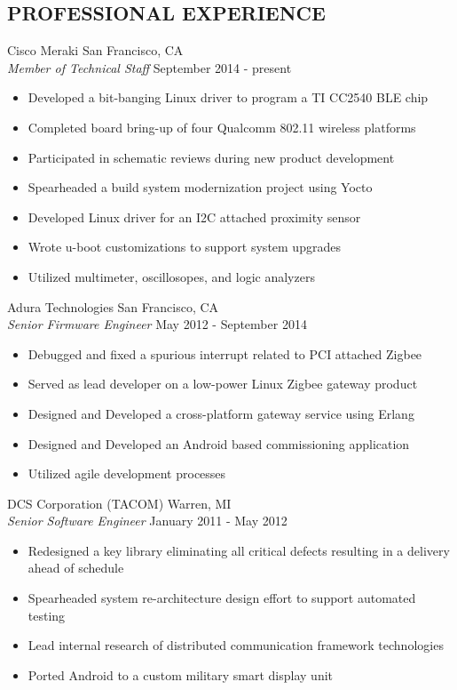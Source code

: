 \documentclass[line]{res}
\begin{document}
\begin{resume}
\section{PROFESSIONAL EXPERIENCE}
    \vspace{1mm}
    Cisco Meraki  \hfill San Francisco, CA\\
    {\sl Member of Technical Staff} \hfill September  2014 - present
    \vspace{1mm}
    \begin{itemize}
        \item Developed a bit-banging Linux driver to program a TI CC2540 BLE chip
        \item Completed board bring-up of four Qualcomm 802.11 wireless platforms
        \item Participated in schematic reviews during new product development 
        \item Spearheaded a build system modernization project using Yocto
        \item Developed Linux driver for an I2C attached proximity sensor
        \item Wrote u-boot customizations to support system upgrades  
        \item Utilized multimeter, oscillosopes, and logic analyzers
    \end{itemize}
    \vspace{1mm}
    Adura Technologies  \hfill San Francisco, CA\\
    {\sl Senior Firmware Engineer} \hfill May  2012 - September 2014
    \vspace{1mm}
    \begin{itemize}
       \item Debugged and fixed a spurious interrupt related to PCI attached Zigbee
       \item Served as lead developer on a low-power Linux Zigbee gateway product
       \item Designed and Developed a cross-platform gateway service using Erlang
       \item Designed and Developed an Android based commissioning application
       \item Utilized agile development processes
    \end{itemize}
    \vspace{-1mm}
    DCS Corporation (TACOM)  \hfill Warren, MI\\
    {\sl Senior Software Engineer} \hfill January 2011 - May 2012
    \vspace{1mm}
    \begin{itemize}
       \item Redesigned a key library eliminating all critical defects resulting in a delivery ahead of schedule
       \item Spearheaded system re-architecture design effort to support automated testing
       \item Lead internal research of distributed communication framework technologies
       \item Ported Android to a custom military smart display unit
    \end{itemize}


\end{resume}
\end{document}

